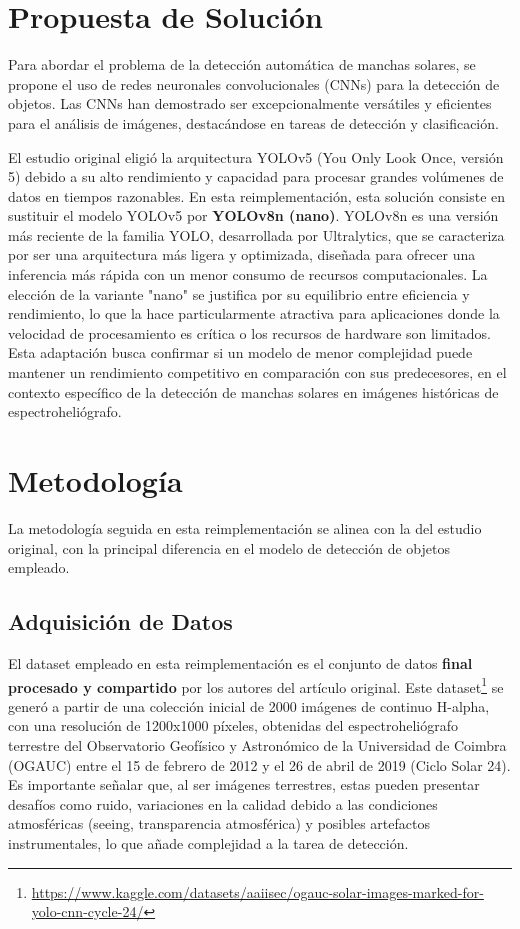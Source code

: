 \documentclass[journal]{IEEEtran}
\begin{document}
\section{Propuesta de Solución}
Para abordar el problema de la detección automática de manchas solares, se propone el uso de redes neuronales convolucionales (CNNs) para la detección de objetos. Las CNNs han demostrado ser excepcionalmente versátiles y eficientes para el análisis de imágenes, destacándose en tareas de detección y clasificación.

El estudio original eligió la arquitectura YOLOv5 (You Only Look Once, versión 5) debido a su alto rendimiento y capacidad para procesar grandes volúmenes de datos en tiempos razonables. En esta reimplementación, esta solución consiste en sustituir el modelo YOLOv5 por \textbf{YOLOv8n (nano)}. YOLOv8n es una versión más reciente de la familia YOLO, desarrollada por Ultralytics, que se caracteriza por ser una arquitectura más ligera y optimizada, diseñada para ofrecer una inferencia más rápida con un menor consumo de recursos computacionales. La elección de la variante "nano" se justifica por su equilibrio entre eficiencia y rendimiento, lo que la hace particularmente atractiva para aplicaciones donde la velocidad de procesamiento es crítica o los recursos de hardware son limitados. Esta adaptación busca confirmar si un modelo de menor complejidad puede mantener un rendimiento competitivo en comparación con sus predecesores, en el contexto específico de la detección de manchas solares en imágenes históricas de espectroheliógrafo.

\section{Metodología}
La metodología seguida en esta reimplementación se alinea con la del estudio original, con la principal diferencia en el modelo de detección de objetos empleado.

\subsection{Adquisición de Datos}
El dataset empleado en esta reimplementación es el conjunto de datos \textbf{final procesado y compartido} por los autores del artículo original. Este dataset\footnote{\url{https://www.kaggle.com/datasets/aaiisec/ogauc-solar-images-marked-for-yolo-cnn-cycle-24/}} se generó a partir de una colección inicial de 2000 imágenes de continuo H-alpha, con una resolución de 1200x1000 píxeles, obtenidas del espectroheliógrafo terrestre del Observatorio Geofísico y Astronómico de la Universidad de Coimbra (OGAUC) entre el 15 de febrero de 2012 y el 26 de abril de 2019 (Ciclo Solar 24). Es importante señalar que, al ser imágenes terrestres, estas pueden presentar desafíos como ruido, variaciones en la calidad debido a las condiciones atmosféricas (seeing, transparencia atmosférica) y posibles artefactos instrumentales, lo que añade complejidad a la tarea de detección.
\end{document}
